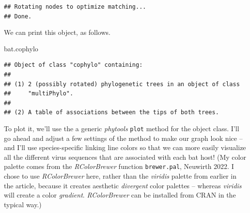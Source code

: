 \documentclass[fleqn,10pt,lineno]{wlpeerj} %
\newenvironment{Shaded}{\begin{snugshade}}{\end{snugshade}}
\newcommand{\NormalTok}[1]{#1}
\begin{document}
\begin{verbatim}
## Rotating nodes to optimize matching...
## Done.
\end{verbatim}

We can print this object, as follows.

\begin{Shaded}
\begin{Highlighting}[]
\NormalTok{bat.cophylo}
\end{Highlighting}
\end{Shaded}

\begin{verbatim}
## Object of class "cophylo" containing:
## 
## (1) 2 (possibly rotated) phylogenetic trees in an object of class 
##     "multiPhylo".
## 
## (2) A table of associations between the tips of both trees.
\end{verbatim}

To plot it, we'll use the a generic \emph{phytools} \texttt{plot} method for the object class. I'll go ahead and adjust a few settings of the method to make our graph look nice -- and I'll use species-specific linking line colors so that we can more easily visualize all the different virus sequences that are associated with each bat host! (My color palette comes from the \emph{RColorBrewer} function \texttt{brewer.pal}, Neuwirth 2022. I chose to use \emph{RColorBrewer} here, rather than the \emph{viridis} palette from earlier in the article, because it creates aesthetic \emph{divergent} color palettes -- whereas \emph{viridis} will create a color \emph{gradient}. \emph{RColorBrewer} can be installed from CRAN in the typical way.)
\end{document}
